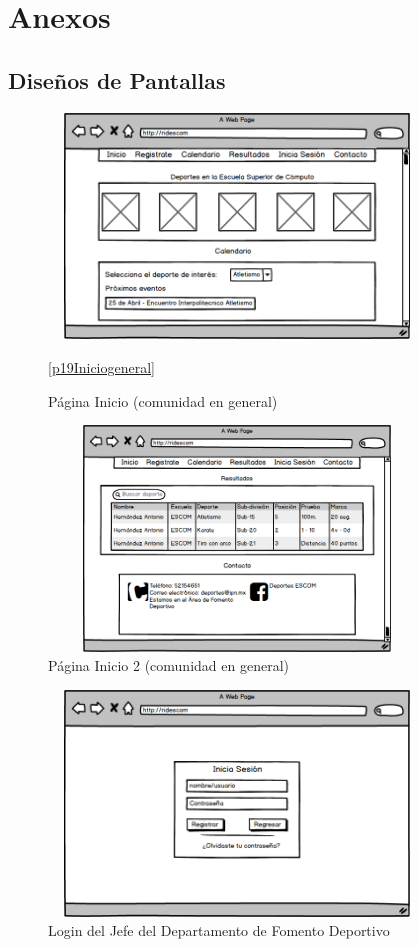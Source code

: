 \chapter{Anexos}
	\section{Diseños de Pantallas}
		\begin{figure}[hbt!]
			\centering
			\includegraphics[width=10cm, height=6cm]{Imagenes/Disenos/p19Iniciogeneral.png}
			\caption{Página Inicio (comunidad en general)}
			\label{Iniciogeneral}
			\ref{p19Iniciogeneral}
		\end{figure}
		\pagebreak
		
		\begin{figure}[hbt!]
			\centering
			\includegraphics[width=10cm, height=6cm]{Imagenes/Disenos/p20Iniciogeneral1.png}
			\caption{Página Inicio 2 (comunidad en general)}
			\label{Iniciogeneral1}
		\end{figure}
	
		\begin{figure}[hbt!]
			\centering
			\includegraphics[width=10cm, height=6cm]{Imagenes/Disenos/p2LoginJFD.png}
			\caption{Login del Jefe del Departamento de Fomento Deportivo}
			\label{LoginJFD}
		\end{figure}
	
